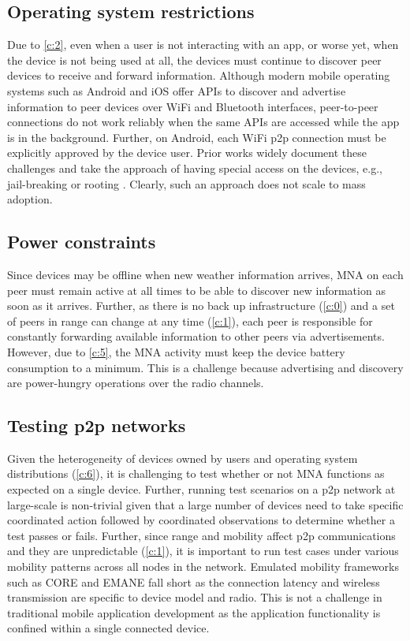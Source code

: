 \documentclass[conference]{IEEEtran}
\begin{document}
\subsection{Operating system restrictions}
\label{ch:os}
%
Due to \ref{c:2}, even when a user is not interacting with an app, or
worse yet, when the device is not being used at all, the devices must
continue to discover peer devices to receive and forward
information. Although modern mobile operating systems such as Android
and iOS offer APIs to discover and advertise information to peer
devices over WiFi and Bluetooth interfaces, peer-to-peer connections
do not work reliably when the same APIs are accessed while the app is
in the background. Further, on Android, each WiFi p2p connection must
be explicitly approved by the device user. Prior works widely document
these challenges and take the approach of having special access on the
devices, e.g., jail-breaking or rooting
\cite{gardner-stephen-serval-2011}. Clearly, such an approach does not
scale to mass adoption.\\
%
\subsection{Power constraints}
\label{ch:power}
%
Since devices may be offline when new weather information arrives, MNA
on each peer must remain active at all times to be able to discover
new information as soon as it arrives. Further, as there is no back up
infrastructure (\ref{c:0}) and a set of peers in range can change at
any time (\ref{c:1}), each peer is responsible for constantly
forwarding available information to other peers via
advertisements. However, due to \ref{c:5}, the MNA activity must keep
the device battery consumption to a minimum. This is a challenge
because advertising and discovery are power-hungry operations over the
radio channels.
%
\subsection{Testing p2p networks}
%
Given the heterogeneity of devices owned by users and operating system
distributions (\ref{c:6}), it is challenging to test whether or not
MNA functions as expected on a single device. Further, running test
scenarios on a p2p network at large-scale is non-trivial given that a
large number of devices need to take specific coordinated action
followed by coordinated observations to determine whether a test
passes or fails. Further, since range and mobility affect p2p
communications and they are unpredictable (\ref{c:1}), it is important
to run test cases under various mobility patterns across all nodes in
the network.  Emulated mobility frameworks such as CORE
\cite{arenholz-core-2008} and EMANE \cite{emane} fall short as the
connection latency and wireless transmission are specific to device
model and radio.  This is not a challenge in traditional mobile
application development as the application functionality is confined
within a single connected device.
%
\end{document}
